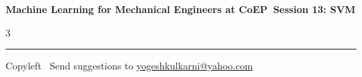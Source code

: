 \documentclass[8pt,landscape]{article}
\begin{document}
\footnotesize

\begin{center}
\Large{\textbf{Machine Learning for Mechanical Engineers at CoEP\ Session 13: SVM}}
\end{center}

\begin{multicols}{3}

\end{multicols}

\rule{\linewidth}{0.25pt}
\scriptsize
Copyleft \textcopyleft\  Send suggestions to
\href{http://www.yogeshkulkarni.com}{yogeshkulkarni@yahoo.com}
\end{document}
